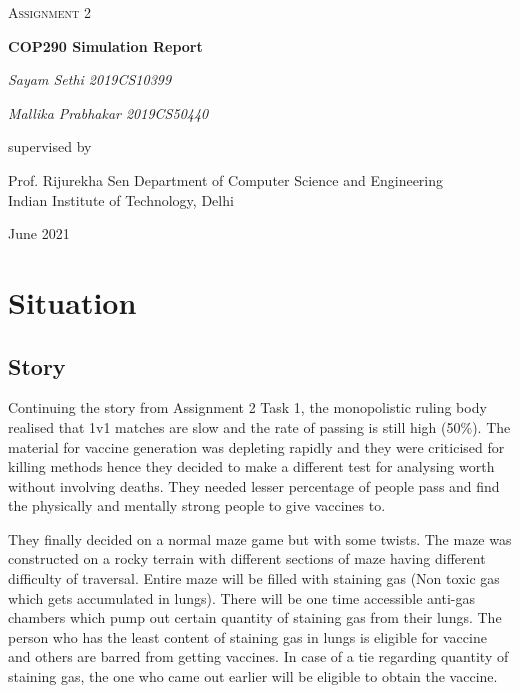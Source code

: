 \documentclass[12pt]{report}
\begin{document}
\begin{titlepage}
	\centering
	\vspace{1cm}
	{\scshape\Large Assignment 2 \par}
	\vspace{1.5cm}
	{\huge\bfseries COP290 Simulation Report\par}
	\vspace{2cm}
	{\Large\itshape Sayam Sethi 2019CS10399\par}
	{\Large\itshape Mallika Prabhakar 2019CS50440\par}
	\vfill
	supervised by\par
	Prof. Rijurekha Sen
    \vfill
	Department of Computer Science and Engineering\\
	Indian Institute of Technology, Delhi\par
	\vfill

	{\large June 2021\par}
\end{titlepage}

\tableofcontents


\chapter{Situation}
\section{Story}
Continuing the story from Assignment 2 Task 1, the monopolistic ruling body realised that 1v1 matches are slow and the rate of passing is still high (50\%). The material for vaccine generation was depleting rapidly and they were criticised for killing methods hence they decided to make a different test for analysing worth without involving deaths. They needed lesser percentage of people pass and find the physically and mentally strong people to give vaccines to.

They finally decided on a normal maze game but with some twists. The maze was constructed on a rocky terrain with different sections of maze having different difficulty of traversal. Entire maze will be filled with staining gas (Non toxic gas which gets accumulated in lungs). There will be one time accessible anti-gas chambers which pump out certain quantity of staining gas from their lungs. The person who has the least content of staining gas in lungs is eligible for vaccine and others are barred from getting vaccines. In case of a tie regarding quantity of staining gas, the one who came out earlier will be eligible to obtain the vaccine.
\end{document}
